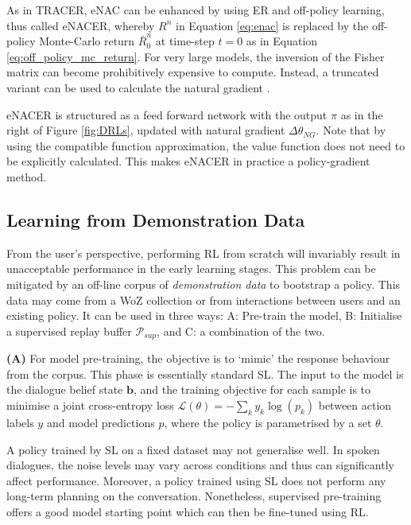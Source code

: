 \documentclass[11pt,a4paper]{article}
\begin{document}
As in TRACER, eNAC can be enhanced by using ER and off-policy learning, thus called eNACER, whereby 
$R^n$ in Equation \ref{eq:enac} is replaced by the off-policy Monte-Carlo return $\bar{R}^n_0$ at time-step $t=0$ as in Equation \ref{eq:off_policy_mc_return}.
For very large models,
the inversion of the Fisher matrix can become prohibitively expensive to compute. Instead, a truncated variant can be used to calculate the natural gradient \cite{schulman2015trust}.

eNACER is structured as a feed forward network with the output $\pi$ as in the right of Figure \ref{fig:DRLs}, updated with natural gradient $\Delta {\theta_{NG}}$. Note that by using the compatible function approximation, the value function does not need to be explicitly calculated. This makes eNACER in practice a policy-gradient method.

\subsection{Learning from Demonstration Data} \label{sec:SLRL}

From the user's perspective, performing RL from scratch will invariably result in unacceptable performance in the
early learning stages. 
This problem can be mitigated by 
an off-line corpus of {\it demonstration data} to bootstrap a policy. 
This data may come from a WoZ collection or from interactions between users and an existing policy.
It can be used in three ways:
A: Pre-train the model, B: Initialise a supervised replay buffer $\mathcal{P}_{sup}$, and C: a combination of the two.

{\bf (A)} For model pre-training, the objective is to `mimic' the response behaviour from the corpus. This phase is essentially standard SL. 
The input to the model is the dialogue belief state $\mathbf{b}$, and the training objective for each sample is to minimise a joint cross-entropy loss $\mathcal{L}(\theta) = -\sum\nolimits_{k} y_k \log(p_k)$ between action labels $y$ and model predictions $p$, where the policy is parametrised by a set $\theta$.

A policy trained by SL on a fixed dataset may not generalise well. In spoken dialogues, the noise levels may vary across conditions and thus can significantly affect performance. Moreover, a policy trained using SL does not perform any long-term planning on the conversation. Nonetheless, supervised pre-training offers a good model starting point
which can then be fine-tuned using RL.
\end{document}
